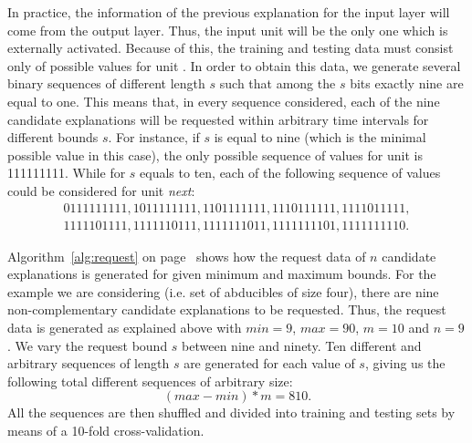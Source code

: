 In practice, the information of the previous explanation for the input layer will come from the output layer. Thus, the input unit \Next will be the only one which is externally activated. Because of this, the training and testing data must consist only of possible values for unit \Next. In order to obtain this data, we generate several binary sequences of different length $s$ such that among the $s$ bits exactly nine are equal to one. This means that, in every sequence considered, each of the nine candidate explanations will be requested within arbitrary time intervals for different bounds $s$. For instance, if $s$ is equal to nine (which is the minimal possible value in this case), the only possible sequence of values for unit \Next is 111111111. While for $s$ equals to ten, each of the following sequence of values could be considered for unit \textit{next}: 
\[
\begin{array}{ccc}
&0111111111, 1011111111, 1101111111, 1110111111, 1111011111, &\\
&1111101111, 1111110111, 1111111011, 1111111101, 1111111110. &
\end{array}
\]

Algorithm~\ref{alg:request} on page~\pageref{alg:request} shows how the request data of $n$ candidate explanations is generated for given minimum and maximum bounds. For the example we are considering (i.e. set of abducibles of size four), there are nine non-complementary candidate explanations to be requested. Thus, the request data is generated as explained above with $min = 9$, $max = 90$, $m = 10$ and $n = 9$. We vary the request bound $s$ between nine and ninety. Ten different and arbitrary sequences of length $s$ are generated for each value of $s$, giving us the following total different sequences of arbitrary size:
\[
(max - min)*m = 810.
\]
All the sequences are then shuffled and divided into training and testing sets by means of a 10-fold cross-validation.


